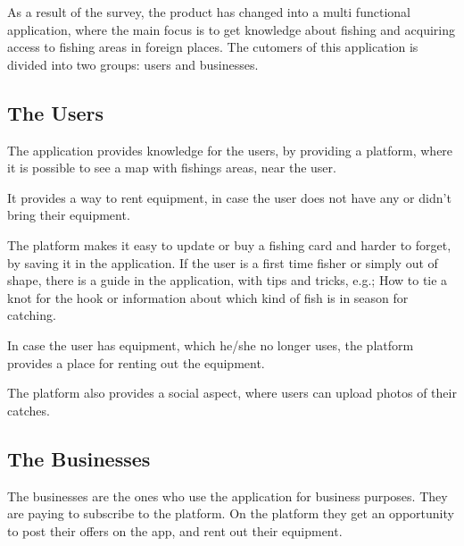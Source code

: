 As a result of the survey, the product has changed into a multi functional application, where the main focus is to get knowledge about fishing and acquiring access to fishing areas in foreign places. 
The cutomers of this application is divided into two groups: users and businesses. 

\subsection{The Users}
The application provides knowledge for the users, by providing a platform, where it is possible to see a map with fishings areas, near the user.

It provides a way to rent equipment, in case the user does not have any or didn’t bring their equipment. 

The platform makes it easy to update or buy a fishing card and harder to forget, by saving it in the application. If the user is a first time fisher or simply out of shape, there is a guide in the application, with tips and tricks, e.g.; How to tie a knot for the hook or information about which kind of fish is in season for catching. 

In case the user has equipment, which he/she no longer uses, the platform provides a place for renting out the equipment.

The platform also provides a social aspect, where users can upload photos of their catches. 


\subsection{The Businesses} 
The businesses are the ones who use the application for business purposes. They are paying to subscribe to the platform. On the platform they get an opportunity to post their offers on the app, and rent out their equipment.

